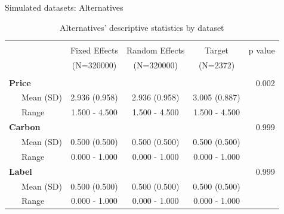 \documentclass[11pt,ignorenonframetext,]{beamer}
\begin{document}
\begin{frame}{Simulated datasets: Alternatives}
\protect\hypertarget{simulated-datasets-alternatives}{}

\scriptsize

\begin{table}[!htbp] \centering 
  \caption{Alternatives' descriptive statistics by dataset} 
\begin{tabular}{@{\extracolsep{5pt}}lcccr}
\\[-1.8ex]\hline 
\hline \\[-1.8ex] 
 & Fixed Effects  & Random Effects  & Target  & p value\\
 & (N=320000) & (N=320000) & (N=2372) &  \\
\hline \\[-1.8ex] 
\textbf{Price} &  &  &  & 0.002\\
~~~Mean (SD) & 2.936 (0.958) & 2.936 (0.958) & 3.005 (0.887) & \\
~~~Range & 1.500 - 4.500 & 1.500 - 4.500 & 1.500 - 4.500 & \\
\textbf{Carbon} &  &  &  & 0.999\\
~~~Mean (SD) & 0.500 (0.500) & 0.500 (0.500) & 0.500 (0.500) & \\
~~~Range & 0.000 - 1.000 & 0.000 - 1.000 & 0.000 - 1.000 & \\
\textbf{Label} &  &  &  & 0.999\\
~~~Mean (SD) & 0.500 (0.500) & 0.500 (0.500) & 0.500 (0.500) & \\
~~~Range & 0.000 - 1.000 & 0.000 - 1.000 & 0.000 - 1.000 & \\
\hline
\end{tabular}
\end{table}
\normalsize

\end{frame}
\end{document}
